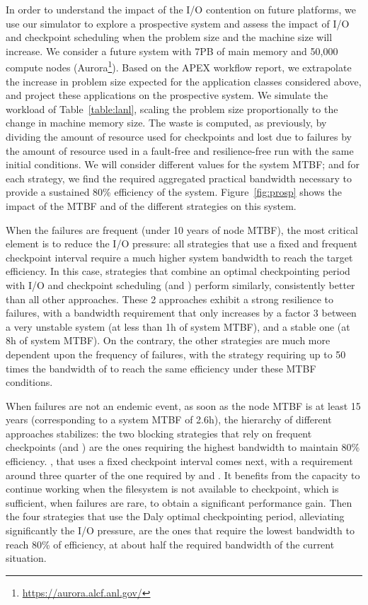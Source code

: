 In order to understand the impact of the I/O contention on future platforms, we
use our simulator to explore a prospective system and assess the impact of I/O
and checkpoint scheduling when the problem size and the machine size will
increase. We consider a future system with 7PB of main memory and 50,000 compute
nodes (Aurora\footnote{\url{https://aurora.alcf.anl.gov/}}). Based on the APEX
workflow report, we extrapolate the increase in problem size expected for the
application classes considered above, and project these applications on the
prospective system.  We simulate the workload of Table~\ref{table:lanl}, scaling
the problem size proportionally to the change in machine memory size. The waste
is computed, as previously, by dividing the amount of resource used for
checkpoints and lost due to failures by the amount of resource used in a
fault-free and resilience-free run with the same initial conditions.
%
We will consider different values for the system MTBF; and for each strategy, we
find the required aggregated practical bandwidth necessary to provide a
sustained 80\% efficiency of the system.
%
Figure~\ref{fig:prosp} shows the impact of the MTBF and of the
different strategies on this system.

When the failures are frequent (under 10 years of node MTBF), the most critical
element is to reduce the I/O pressure: all strategies that use a fixed and
frequent checkpoint interval require a much higher system bandwidth to reach the
target efficiency.  In this case, strategies that combine an optimal
checkpointing period with I/O and checkpoint scheduling (\cooperative and
\fifodaly) perform similarly, consistently better than all other approaches.
These 2 approaches exhibit a strong resilience to failures, with a bandwidth
requirement that only increases by a factor 3 between a very unstable system (at
less than 1h of system MTBF), and a stable one (at 8h of system MTBF). On the
contrary, the other strategies are much more dependent upon the frequency of
failures, with the \propfixed strategy requiring up to 50 times the bandwidth of
\cooperative to reach the same efficiency under these MTBF conditions.

When failures are not an endemic
event, \ie as soon as the node MTBF is at least 15 years
(corresponding to a system MTBF of 2.6h), the hierarchy of different
approaches stabilizes: the two blocking strategies that rely on
frequent checkpoints (\propfixed and \bfifofixed) are the ones
requiring the highest bandwidth to maintain 80\%
efficiency. %
\fifofixed, that uses a fixed checkpoint interval comes next, with a
requirement around three quarter of the one required by \propfixed and
\fifofixed. It benefits from the capacity to continue working when the
filesystem is not available to checkpoint, which is sufficient, when
failures are rare, to obtain a significant performance
gain. %
Then the four strategies that use the Daly optimal checkpointing
period, alleviating significantly the I/O pressure, are the ones that
require the lowest bandwidth to reach 80\% of efficiency, at about
half the required bandwidth of the current
situation. %
